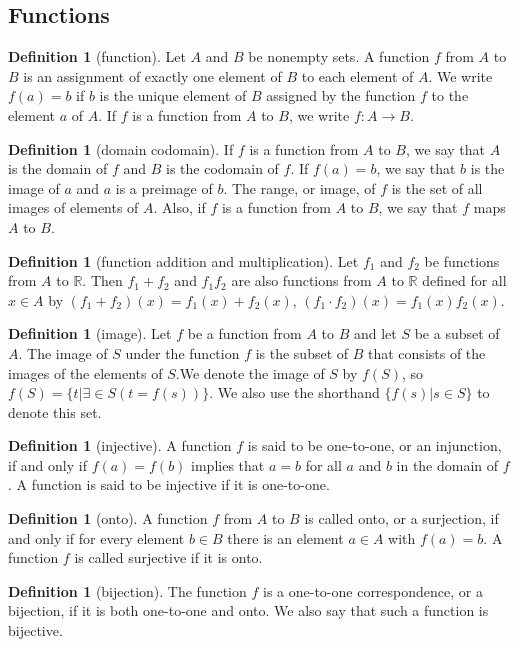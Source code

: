\documentclass[letterpaper,10pt]{article}
\theoremstyle{plain}
\theoremstyle{definition}
\newtheorem{defn}[thm]{Definition}
\theoremstyle{remark}
\begin{document}
\newpage
\subsection{Functions}

\begin{defn}[function]
Let $A$ and $B$ be nonempty sets. A function $f$ from $A$ to $B$ is an assignment of exactly one
element of $B$ to each element of $A$. We write $f (a) = b$ if $b$ is the unique element of $B$
assigned by the function $f$ to the element $a$ of $A$. If $f$ is a function from $A$ to $B$, we write
$f : A \to B$.
\end{defn}
\begin{defn}[domain codomain]
If $f$ is a function from $A$ to $B$, we say that $A$ is the domain of $f$ and $B$ is the codomain of $f$.
If $f (a) = b$, we say that $b$ is the image of $a$ and $a$ is a preimage of $b$. The range, or image,
of $f$ is the set of all images of elements of $A$. Also, if $f$ is a function from $A$ to $B$, we say
that $f$ maps $A$ to $B$.
\end{defn}
\begin{defn}[function addition and multiplication]
Let $f_1$ and $f_2$ be functions from $A$ to $\mathbb{R}$. Then $f_1 + f_2$ and $f_1f_2$ are also functions from $A$
to $\mathbb{R}$ defined for all $x \in A$ by
$(f_1 + f_2)(x) = f_1(x) + f_2(x)$,
$(f_1\cdot f_2)(x) = f_1(x)f_2(x)$.
\end{defn}
\begin{defn}[image]
Let $f$ be a function from $A$ to $B$ and let $S$ be a subset of $A$. The image of $S$ under the function
$f$ is the subset of $B$ that consists of the images of the elements of $S$.We denote the image of
$S$ by $f (S)$, so
$f (S) = \{t | \exists \in S (t = f (s))\}$.
We also use the shorthand $\{f (s) | s \in S\}$ to denote this set.
\end{defn}
\begin{defn}[injective]
A function $f$ is said to be one-to-one, or an injunction, if and only if $f (a) = f (b)$ implies that
$a = b$ for all $a$ and $b$ in the domain of $f$. A function is said to be injective if it is one-to-one.
\end{defn}

\begin{defn}[onto]
A function $f$ from $A$ to $B$ is called onto, or a surjection, if and only if for every element
$b \in B$ there is an element $a \in A$ with $f (a) = b$. A function $f$ is called surjective if it is onto.
\end{defn}
\begin{defn}[bijection]
The function $f$ is a one-to-one correspondence, or a bijection, if it is both one-to-one and
onto. We also say that such a function is bijective.
\end{defn}
\end{document}
